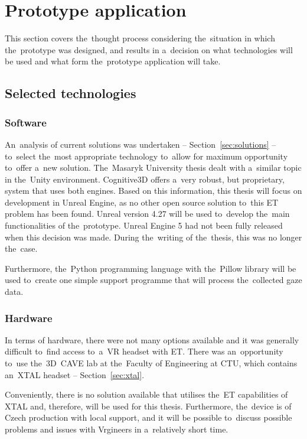 \section{Prototype application}
This section covers the~thought process considering the~situation in which the~prototype was designed, and results in a~decision on what technologies will be used and what form the~prototype application will take.

\subsection{Selected technologies}
\subsubsection*{Software}
An~analysis of current solutions was undertaken -- Section~\ref{sec:solutions} -- to~select the~most appropriate technology to~allow for maximum opportunity to~offer a~new solution. The~Masaryk University thesis dealt with a~similar topic in the~Unity environment. Cognitive3D offers a~very robust, but proprietary, system that uses both engines. Based on this information, this thesis will focus on development in Unreal Engine, as no other open source solution to~this ET problem has been found. Unreal version 4.27 will be used to~develop the~main functionalities of the~prototype. Unreal Engine 5 had not been fully released when this decision was made. During the~writing of the~thesis, this was no longer the~case.

Furthermore, the~Python programming language with the~Pillow library will be used to~create one simple support programme that will process the~collected gaze data.

\subsubsection*{Hardware}
In terms of hardware, there were not many options available and it was generally difficult to~find access to~a~VR headset with ET. There was an~opportunity to~use the~3D~CAVE lab at the~Faculty of Engineering at CTU, which contains an~XTAL headset -- Section~\ref{sec:xtal}. 


Conveniently, there is no solution available that utilises the~ET capabilities of XTAL and, therefore, will be used for this thesis. Furthermore, the~device is of Czech production with local support, and it will be possible to~discuss possible problems and issues with Vrgineers in a~relatively short time.

